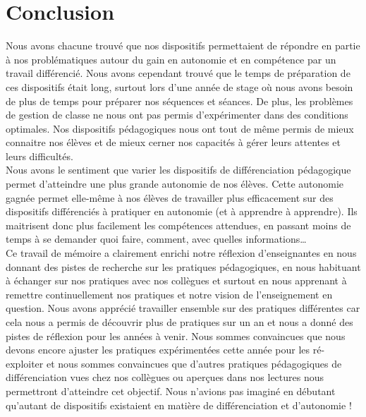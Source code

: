 \section{Conclusion}
Nous avons chacune trouvé que nos dispositifs permettaient de répondre en partie à nos problématiques autour du gain en autonomie et en compétence par un travail différencié. Nous avons cependant trouvé que le temps de préparation de ces dispositifs était long, surtout lors d'une année de stage où nous avons besoin de plus de temps pour préparer nos séquences et séances. De plus, les problèmes de gestion de classe ne nous ont pas permis d'expérimenter dans des conditions optimales. Nos dispositifs pédagogiques nous ont tout de même permis de mieux connaitre nos élèves et de mieux cerner nos capacités à gérer leurs attentes et leurs difficultés.\\
Nous avons le sentiment que varier les dispositifs de différenciation pédagogique permet d'atteindre une plus grande autonomie de nos élèves. Cette autonomie gagnée permet elle-même à nos élèves de travailler plus efficacement sur des dispositifs différenciés à pratiquer en autonomie (et à apprendre à apprendre). Ils maitrisent donc plus facilement les compétences attendues, en passant moins de temps à se demander quoi faire, comment, avec quelles informations\ldots \\
Ce travail de mémoire a clairement enrichi notre réflexion d'enseignantes en nous donnant des pistes de recherche sur les pratiques pédagogiques, en nous habituant à échanger sur nos pratiques avec nos collègues et surtout en nous apprenant à remettre continuellement nos pratiques et notre vision de l'enseignement en question. Nous avons apprécié travailler ensemble sur des pratiques différentes car cela nous a permis de découvrir plus de pratiques sur un an et nous a donné des pistes de réflexion pour les années à venir. Nous sommes convaincues que nous devons encore ajuster les pratiques expérimentées cette année pour les ré-exploiter et nous sommes convaincues que d'autres pratiques pédagogiques de différenciation vues chez nos collègues ou aperçues dans nos lectures nous permettront d'atteindre cet objectif. Nous n'avions pas imaginé en débutant qu'autant de dispositifs existaient en matière de différenciation et d'autonomie !